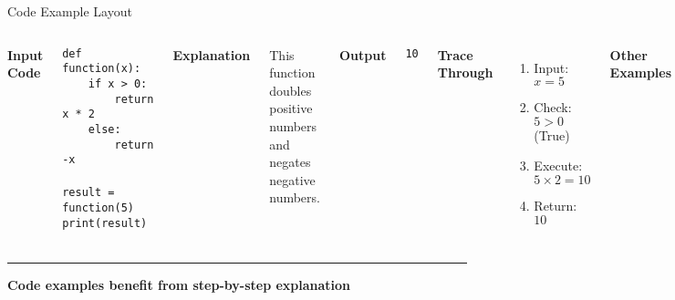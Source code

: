 \documentclass[8pt,aspectratio=169]{beamer}
\newcommand{\bottomnote}[1]{%
\vfill
\vspace{-2mm}
\textcolor{mllavender2}{\rule{\textwidth}{0.4pt}}
\vspace{1mm}
\footnotesize
\textbf{#1}
}
\begin{document}
\begin{frame}[t]{Code Example Layout}
\begin{columns}[T]
\textbf{Input Code}

\texttt{def function(x):}\\
\texttt{~~~~if x > 0:}\\
\texttt{~~~~~~~~return x * 2}\\
\texttt{~~~~else:}\\
\texttt{~~~~~~~~return -x}\\
\texttt{}\\
\texttt{result = function(5)}\\
\texttt{print(result)}

\vspace{0.5em}
\textbf{Explanation}

This function doubles positive numbers and negates negative numbers.

\textbf{Output}

\texttt{10}

\vspace{0.5em}
\textbf{Trace Through}
\begin{enumerate}
\item Input: $x = 5$
\item Check: $5 > 0$ (True)
\item Execute: $5 \times 2 = 10$
\item Return: $10$
\end{enumerate}

\textbf{Other Examples}
\begin{itemize}
\item $f(3) = 6$
\item $f(-4) = 4$
\item $f(0) = 0$
\end{itemize}
\end{columns}

\bottomnote{Code examples benefit from step-by-step explanation}
\end{frame}
\end{document}
